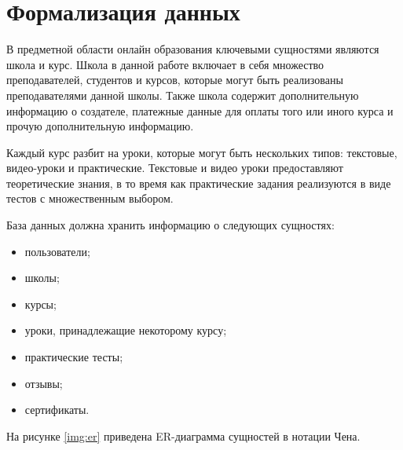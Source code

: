 \section{Формализация данных}
В предметной области онлайн образования ключевыми сущностями являются школа и курс. Школа в данной работе включает в себя множество преподавателей, студентов и курсов, которые могут быть реализованы
преподавателями данной школы. Также школа содержит дополнительную информацию о создателе, платежные данные
для оплаты того или иного курса и прочую дополнительную информацию.

Каждый курс разбит на уроки, которые могут быть нескольких типов: текстовые, видео-уроки и практические.
Текстовые и видео уроки предоставляют теоретические знания, в то время как практические задания
реализуются в виде тестов с множественным выбором.

База данных должна хранить информацию о следующих сущностях:
\begin{itemize}
    \item пользователи;
    \item школы;
    \item курсы;
    \item уроки, принадлежащие некоторому курсу;
    \item практические тесты;
    \item отзывы;
    \item сертификаты.
\end{itemize}

На рисунке \ref{img:er} приведена ER-диаграмма сущностей в нотации Чена.

